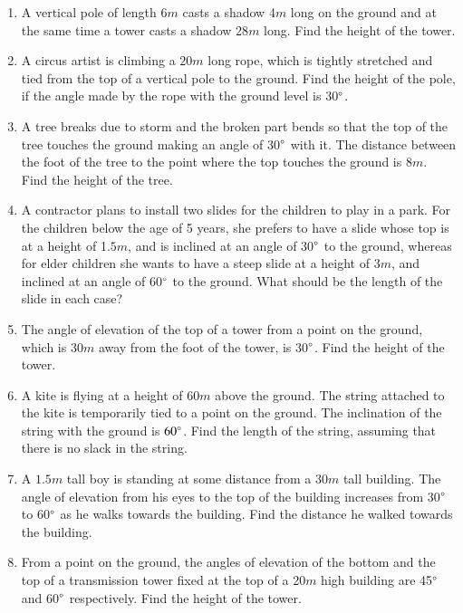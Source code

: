 \begin{enumerate}[label=\thesubsection.\arabic*.,ref=\thesubsection.\theenumi]
%
\item  A vertical pole of length 6$m$ casts a shadow 4$m$ long on the ground and at the same time a tower casts a shadow 28$m$ long. Find the height of the tower.
\item A circus artist is climbing a $20m$ long rope, which is tightly stretched and tied from the top of a vertical pole to the ground.  Find the height of the pole, if the angle made by the rope with the ground level is 30$\degree$.
%
\item A tree breaks due to storm and the broken part bends so that the top of the tree touches the ground making an angle of 30$\degree$ with it.  The distance between the foot of the tree to the point where the top touches the ground is $8m$.  Find the height of the tree.
%
\item A contractor plans to install two slides for the children to play in a park.  For the children below the age of 5 years, she prefers to have a slide whose top is at a height of 1.$5m$, and is inclined at an angle of 30$\degree$  to the ground, whereas for elder children she wants to have a steep slide at a height of $3m$, and inclined at an angle of 60$\degree$ to the ground.  What should be the length of the slide in each case?
%
\item The angle of elevation of the top of a tower from a point on the ground, which is $30m$ away from the foot of the tower, is 30$\degree$.  Find the height of the tower.
%
\item A kite is flying at a height of $60m$ above the ground.  The string attached to the kite is temporarily tied to a point on the ground.  The inclination of the string with the ground is $60\degree$.  Find the length of the string, assuming that there is no slack in the string.
%
\item A $1.5m$ tall boy is standing at some distance from a $30m$ tall building.  The angle of elevation from his eyes to the top of the building increases from 30$\degree$
 to 60$\degree $ as he walks towards the building.  Find the distance he walked towards the building.

\item From a point on the ground, the angles of elevation of the bottom and the top of a transmission tower fixed at the top of a 20$m$ high building are 45$\degree$ and 60$\degree$ respectively. Find the height of the tower.


\end{enumerate}
